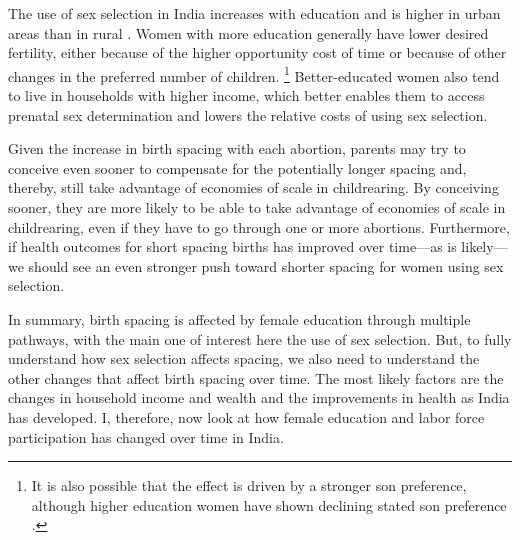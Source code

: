 The use of sex selection in India increases with education and is higher in urban
areas than in rural
\citep{das_gupta97,retherford03b,jha06,Guilmoto2009a,Bongaarts2013,Portner2015b,
Jayachandran2017}.
Women with more education generally have lower desired fertility, either because of the
higher opportunity cost of time or because of other changes in the preferred number of
children.%
\footnote{
It is also possible that the effect is driven by a stronger son preference, although 
higher education women have shown declining stated son preference \citep{bhat03,pande07}.
}
Better-educated women also tend to live in households with higher 
income, which better enables them to access prenatal sex determination and lowers the relative
costs of using sex selection.

Given the increase in birth spacing with each abortion, parents may try to conceive even sooner to compensate for the potentially longer spacing and, thereby, still take advantage of economies of scale in childrearing.
By conceiving sooner, they are more likely to be able to take advantage of economies of
scale in childrearing, even if they have to go through one or more abortions.
Furthermore, if health outcomes for short spacing births has improved over time---as is 
likely---we should see an even stronger push toward shorter spacing for women using sex 
selection.

In summary, birth spacing is affected by female education through 
multiple pathways, with the main one of interest here the use of 
sex selection. But, to fully understand how sex selection affects 
spacing, we also need to understand the other changes that affect 
birth spacing over time.
The most likely factors are the changes in household income and 
wealth and the improvements in health as India has developed.
I, therefore, now look at how female education and labor force 
participation has changed over time in India.


